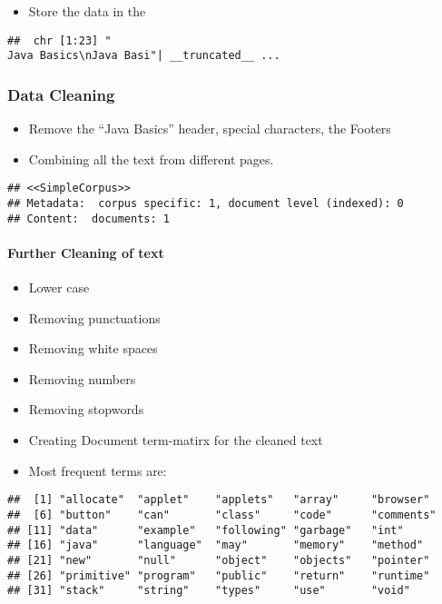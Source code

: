 \documentclass[]{article}
\providecommand{\tightlist}{%
  \setlength{\itemsep}{0pt}\setlength{\parskip}{0pt}}
\let\oldparagraph\paragraph
\renewcommand{\paragraph}[1]{\oldparagraph{#1}\mbox{}}
\begin{document}
\begin{itemize}
\tightlist
\item
  Store the data in the
\end{itemize}

\begin{verbatim}
##  chr [1:23] "                                                                                         Java Basics\nJava Basi"| __truncated__ ...
\end{verbatim}

\subsubsection{Data Cleaning}\label{data-cleaning}

\begin{itemize}
\item
  Remove the ``Java Basics'' header, special characters, the Footers
\item
  Combining all the text from different pages.
\end{itemize}

\begin{verbatim}
## <<SimpleCorpus>>
## Metadata:  corpus specific: 1, document level (indexed): 0
## Content:  documents: 1
\end{verbatim}

\paragraph{Further Cleaning of text}\label{further-cleaning-of-text}

\begin{itemize}
\item
  Lower case
\item
  Removing punctuations
\item
  Removing white spaces
\item
  Removing numbers
\item
  Removing stopwords
\item
  Creating Document term-matirx for the cleaned text
\item
  Most frequent terms are:
\end{itemize}

\begin{verbatim}
##  [1] "allocate"  "applet"    "applets"   "array"     "browser"  
##  [6] "button"    "can"       "class"     "code"      "comments" 
## [11] "data"      "example"   "following" "garbage"   "int"      
## [16] "java"      "language"  "may"       "memory"    "method"   
## [21] "new"       "null"      "object"    "objects"   "pointer"  
## [26] "primitive" "program"   "public"    "return"    "runtime"  
## [31] "stack"     "string"    "types"     "use"       "void"
\end{verbatim}
\end{document}

